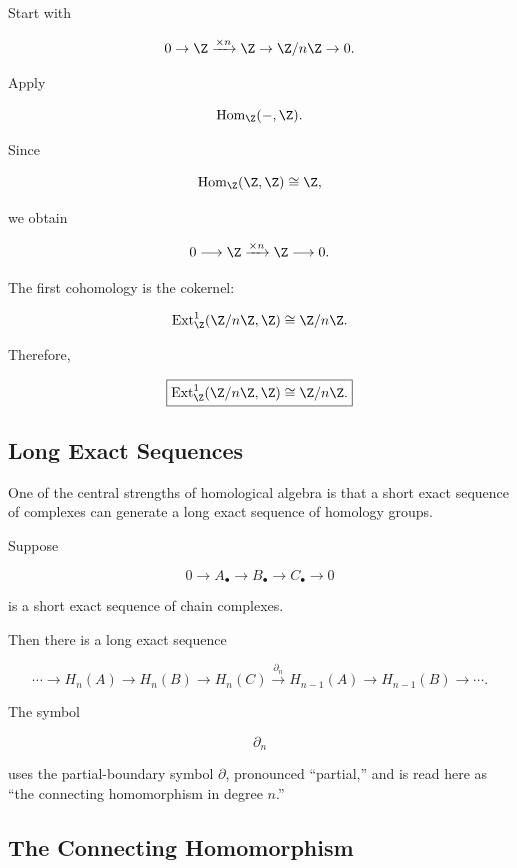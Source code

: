 Start with

\[ 0\to\Z\xrightarrow{\times n}\Z\to\Z/n\Z\to0. \]

Apply

\[ \operatorname{Hom}_{\Z}(-,\Z). \]

Since

\[ \operatorname{Hom}_{\Z}(\Z,\Z)\cong\Z, \]

we obtain

\[ 0\longrightarrow\Z\xrightarrow{\times n}\Z\longrightarrow0. \]

The first cohomology is the cokernel:

\[ \operatorname{Ext}_{\Z}^1(\Z/n\Z,\Z)
\cong\Z/n\Z. \]

Therefore,

\begin{answerbox}
\[ \boxed{\operatorname{Ext}_{\Z}^1(\Z/n\Z,\Z)\cong\Z/n\Z.} \]
\end{answerbox}

\subsection{Long Exact Sequences}
\label{subsec:long-exact-sequences}

One of the central strengths of homological algebra is that a short exact
sequence of complexes can generate a long exact sequence of homology groups.

Suppose

\[ 0\to A_\bullet\to B_\bullet\to C_\bullet\to0 \]

is a short exact sequence of chain complexes.

Then there is a long exact sequence

\[ \cdots\to H_n(A)
\to H_n(B)
\to H_n(C)
\xrightarrow{\partial_n}
H_{n-1}(A)
\to H_{n-1}(B)
\to\cdots. \]

The symbol

\[ \partial_n \]

uses the partial-boundary symbol \(\partial\), pronounced ``partial,'' and is
read here as ``the connecting homomorphism in degree \(n\).''

\subsection{The Connecting Homomorphism}
\label{subsec:connecting-homomorphism}

